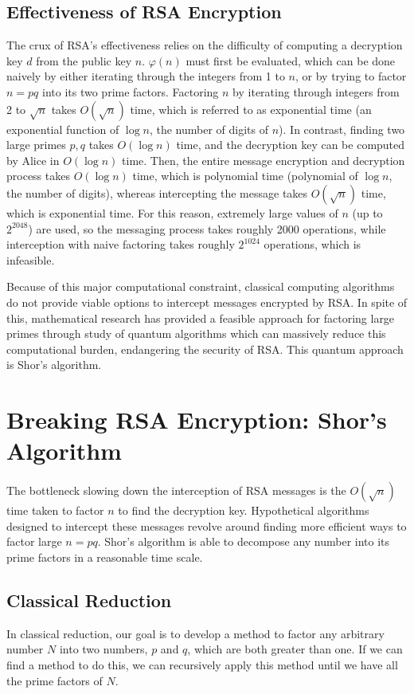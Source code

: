 \documentclass{article}
\begin{document}
\subsection{Effectiveness of RSA Encryption} The crux of RSA's effectiveness relies on the difficulty of computing a decryption key $d$ from the public key $n$. $\varphi(n)$ must first be evaluated, which can be done naively by either iterating through the integers from 1 to $n$, or by trying to factor $n=pq$ into its two prime factors. Factoring $n$ by iterating through integers from 2 to $\sqrt{n}$ takes $O(\sqrt{n})$ time, which is referred to as exponential time (an exponential function of $\log n$, the number of digits of $n$). In contrast, finding two large primes $p, q$ takes $O(\log n)$ time, and the decryption key can be computed by Alice in $O(\log n)$ time. Then, the entire message encryption and decryption process takes $O(\log n)$ time, which is polynomial time (polynomial of $\log n$, the number of digits), whereas intercepting the message takes $O(\sqrt{n})$ time, which is exponential time. For this reason, extremely large values of $n$ (up to $2^{2048}$) are used, so the messaging process takes roughly 2000 operations, while interception with naive factoring takes roughly $2^{1024}$ operations, which is infeasible.

Because of this major computational constraint, classical computing algorithms do not provide viable options to intercept messages encrypted by RSA. In spite of this, mathematical research has provided a feasible approach for factoring large primes through study of quantum algorithms which can massively reduce this computational burden, endangering the security of RSA. This quantum approach is Shor's algorithm.

\section{Breaking RSA Encryption: Shor's Algorithm}
The bottleneck slowing down the interception of RSA messages is the $O(\sqrt{n})$ time taken to factor $n$ to find the decryption key. Hypothetical algorithms designed to intercept these messages revolve around finding more efficient ways to factor large $n = pq$. Shor's algorithm is able to decompose any number into its prime factors in a reasonable time scale.

\subsection{Classical Reduction}
In classical reduction, our goal is to develop a method to factor any arbitrary number $N$ into two numbers, $p$ and $q$, which are both greater than one. If we can find a method to do this, we can recursively apply this method until we have all the prime factors of $N$.
\end{document}
